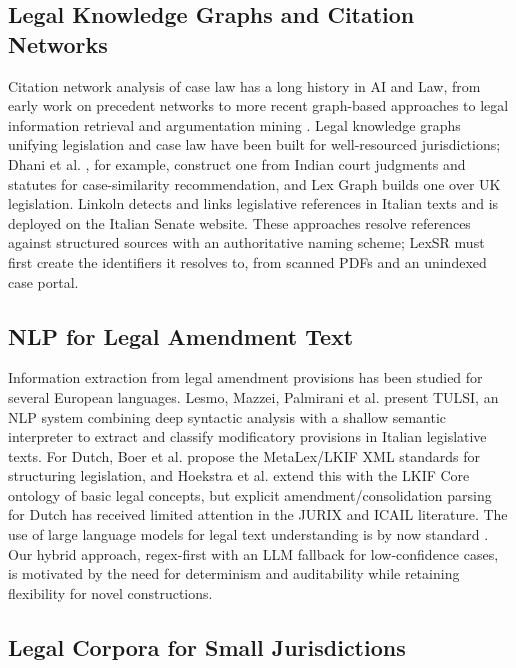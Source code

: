 \documentclass{IOS-Book-Article}
\begin{document}
\subsection{Legal Knowledge Graphs and Citation Networks}

Citation network analysis of case law has a long history in AI and Law, from early work on
precedent networks to more recent graph-based approaches to legal information retrieval and
argumentation mining \cite{benchcapon2012}. Legal knowledge graphs unifying legislation
and case law have been built for well-resourced jurisdictions; Dhani et al.
\cite{dhani2021}, for example, construct one from Indian court judgments and statutes for
case-similarity recommendation, and Lex Graph \cite{lexgraph} builds one over UK
legislation. Linkoln \cite{bacci2019} detects and links legislative
references in Italian texts and is deployed on the Italian Senate website. These approaches
resolve references against structured sources with an authoritative naming scheme; LexSR
must first create the identifiers it resolves to, from scanned PDFs and an unindexed case
portal.

\subsection{NLP for Legal Amendment Text}

Information extraction from legal amendment provisions has been studied for several European
languages. Lesmo, Mazzei, Palmirani et al. \cite{tulsi2013} present TULSI, an NLP system
combining deep syntactic analysis with a shallow semantic interpreter to extract and classify
modificatory provisions in Italian legislative texts. For Dutch, Boer et al. \cite{boer2007}
propose the MetaLex/LKIF XML standards for structuring legislation, and Hoekstra et al.
\cite{hoekstra2007} extend this with the LKIF Core ontology of basic legal concepts, but
explicit amendment/consolidation parsing for Dutch has received limited attention in the
JURIX and ICAIL literature. The use of large language models for
legal text understanding is by now standard \cite{chalkidis2020,koreeda2021}. Our hybrid
approach, regex-first with an LLM fallback for low-confidence cases, is motivated by the need for determinism and auditability while retaining flexibility for novel
constructions.

\subsection{Legal Corpora for Small Jurisdictions}
\end{document}
